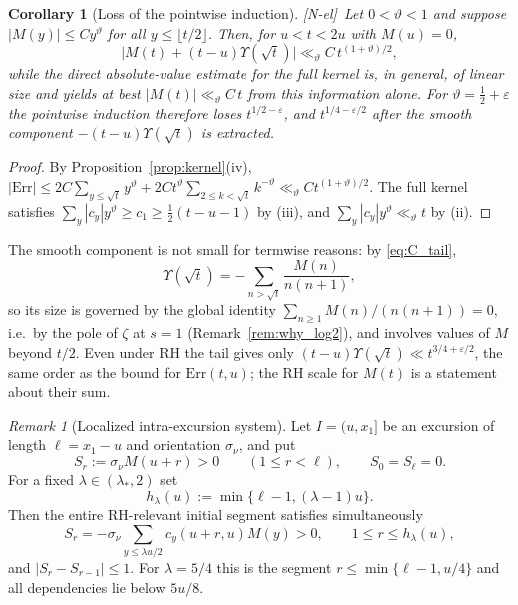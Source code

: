 \documentclass[11pt,reqno]{amsart}
\numberwithin{equation}{section}
\theoremstyle{plain}
\newtheorem{corollary}[theorem]{Corollary}
\theoremstyle{definition}
\theoremstyle{remark}
\newtheorem{remark}[theorem]{Remark}
\newcommand{\eps}{\varepsilon}
\newcommand{\tagNE}{\textup{[N-el]}}
\begin{document}
\begin{corollary}[Loss of the pointwise induction]
\label{cor:induction-loss}
\tagNE\ Let $0<\vartheta<1$ and suppose $|M(y)|\le Cy^\vartheta$ for all $y\le\lfloor t/2\rfloor$. Then,
for $u<t<2u$ with $M(u)=0$,
\begin{equation}
\label{eq:induction-loss}
\bigl|M(t)+(t-u)\Upsilon(\sqrt t)\bigr|\ll_\vartheta C\,t^{(1+\vartheta)/2},
\end{equation}
while the direct absolute-value estimate for the full kernel is, in general,
of linear size and yields at best $|M(t)|\ll_\vartheta C\,t$ from this
information alone. For $\vartheta=\frac12+\eps$ the pointwise induction
therefore loses $t^{1/2-\eps}$, and $t^{1/4-\eps/2}$ after the smooth
component $-(t-u)\Upsilon(\sqrt t)$ is extracted.
\end{corollary}

\begin{proof}
By Proposition~\ref{prop:kernel}(iv),
$|\mathrm{Err}|\le2C\sum_{y\le\sqrt t}y^\vartheta+2Ct^\vartheta\sum_{2\le k<\sqrt t}k^{-\vartheta}
\ll_\vartheta Ct^{(1+\vartheta)/2}$. The full kernel satisfies
$\sum_y|c_y|y^\vartheta\ge c_1\ge\frac12(t-u-1)$ by (iii), and
$\sum_y|c_y|y^\vartheta\ll_\vartheta t$ by (ii).
\end{proof}

The smooth component is not small for termwise reasons: by
\eqref{eq:C_tail},
\begin{equation}
\Upsilon(\sqrt t)=-\sum_{n>\sqrt t}\frac{M(n)}{n(n+1)},
\end{equation}
so its size is governed by the global identity
$\sum_{n\ge1}M(n)/(n(n+1))=0$, i.e.\ by the pole of $\zeta$ at $s=1$
(Remark~\ref{rem:why_log2}), and involves values of $M$ beyond $t/2$. Even
under RH the tail gives only $(t-u)\Upsilon(\sqrt t)\ll t^{3/4+\eps/2}$, the
same order as the bound for $\mathrm{Err}(t,u)$; the RH scale for $M(t)$ is a statement
about their sum.

\begin{remark}[Localized intra-excursion system]
\label{rem:sign-cone}
Let $I=(u,x_1]$ be an excursion of length $\ell=x_1-u$ and orientation
$\sigma_\nu$, and put
\begin{equation}
S_r:=\sigma_\nu M(u+r)>0\qquad(1\le r<\ell),\qquad S_0=S_\ell=0.
\end{equation}
For a fixed $\lambda\in(\lambda_*,2)$ set
\begin{equation}
h_\lambda(u):=\min\{\ell-1,(\lambda-1)u\}.
\end{equation}
Then the entire RH-relevant initial segment satisfies simultaneously
\begin{equation}
S_r=-\sigma_\nu\sum_{y\le\lambda u/2}c_y(u+r,u)M(y)>0,
\qquad1\le r\le h_\lambda(u),
\end{equation}
and $|S_r-S_{r-1}|\le1$.  For $\lambda=5/4$ this is the segment
$r\le\min\{\ell-1,u/4\}$ and all dependencies lie below $5u/8$.
\end{remark}
\end{document}
